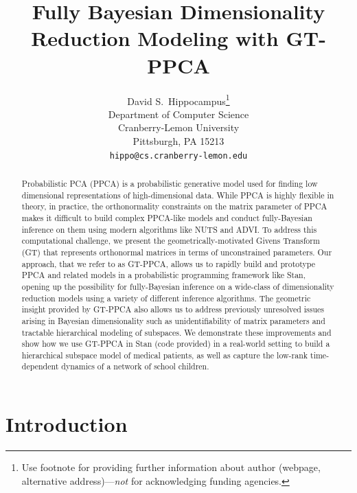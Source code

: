 \documentclass{article}
\title{Fully Bayesian Dimensionality Reduction Modeling with GT-PPCA}
\author{
  David S.~Hippocampus\thanks{Use footnote for providing further
    information about author (webpage, alternative
    address)---\emph{not} for acknowledging funding agencies.} \\
  Department of Computer Science\\
  Cranberry-Lemon University\\
  Pittsburgh, PA 15213 \\
  \texttt{hippo@cs.cranberry-lemon.edu} \\
}
\begin{document}

\maketitle

\begin{abstract}
Probabilistic PCA (PPCA) is a probabilistic generative model used for finding low dimensional representations of high-dimensional data. While PPCA is highly flexible in theory, in practice, the orthonormality constraints on the matrix parameter of PPCA makes it difficult to build complex PPCA-like models and conduct fully-Bayesian inference on them using modern algorithms like NUTS and ADVI. To address this computational challenge, we present the geometrically-motivated Givens Transform (GT) that represents orthonormal matrices in terms of unconstrained parameters. Our approach, that we refer to as GT-PPCA, allows us to rapidly build and prototype PPCA and related models in a probabilistic programming framework like Stan, opening up the possibility for fully-Bayesian inference on a wide-class of dimensionality reduction models using a variety of different inference algorithms. The geometric insight provided by GT-PPCA also allows us to address previously unresolved issues arising in Bayesian dimensionality such as unidentifiability of matrix parameters and tractable hierarchical modeling of subspaces. We demonstrate these improvements and show how we use GT-PPCA in Stan (code provided) in a real-world setting to build a hierarchical subspace model of medical patients, as well as capture the low-rank time-dependent dynamics of a network of school children.
\end{abstract}

\section{Introduction}
\end{document}
